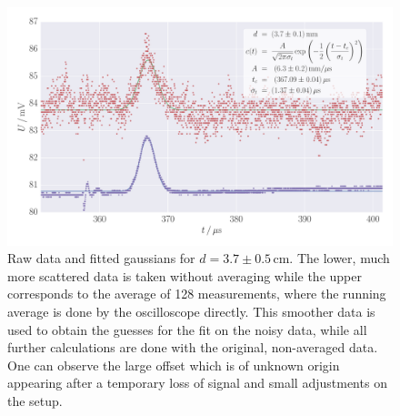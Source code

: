 \renewcommand{\arraystretch}{1.5}
\begin{table}[htdp]
    \centering
    \caption{
        Results of fits with gaussians for all used data sets with distance 
        $d$ between laser and needle. The $\chi^2$-tests are quite high due to the 
        noise and tendencies to ascend on the scale of 10 sigma (compare figures, 
        e.~g.smooth data in figure~\ref{fig:h_s_raw_28}).
        }
    
    \label{tab:h_s_fit_parameter}
\end{table}

\begin{figure}
    \includegraphics[width=1.0\textwidth]{figures/haynes_shockley_raw_28}
    \caption{
        Raw data and fitted gaussians for $d = 3.7 \pm 0.5\,$cm. 
        The lower, much more scattered data is taken without averaging 
        while the upper corresponds to the average of 128 measurements, where the 
        running average is done by the oscilloscope directly. This smoother data is 
        used to obtain the guesses for the fit on the noisy data, 
        while all further calculations are done with the original, 
        non-averaged data. 
        One can observe the large offset which is of unknown origin appearing 
        after a temporary loss of signal and small adjustments on the setup.
        }
    \label{fig:h_s_raw_28}
\end{figure}

